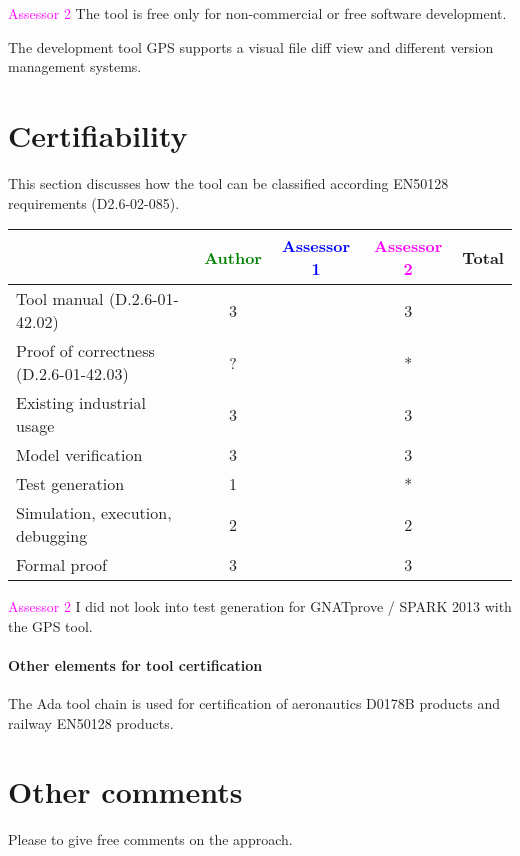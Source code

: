 \textcolor{magenta}{Assessor 2} The tool is free only for non-commercial or free
software development.

The development tool GPS supports a visual file diff view and different version
management systems.

\section{Certifiability}

This section discusses how the tool can be classified according EN50128 requirements (D2.6-02-085).


\begin{tabular}{|l | c | c | c | c|}
\hline
& \textcolor{green}{Author} & \textcolor{blue}{Assessor 1} & \textcolor{magenta}{Assessor 2} & Total \\
\hline 
Tool manual (D.2.6-01-42.02) & 3    & & 3    &  \\
\hline
Proof of correctness (D.2.6-01-42.03)   & ? & & * & \\
\hline
Existing industrial  usage  & 3    &  & 3    & \\
\hline
Model verification & 3    & & 3    & \\
\hline
Test generation & 1    & & * & \\
\hline
Simulation, execution, debugging & 2    & & 2    & \\
\hline
Formal proof & 3    & & 3    & \\
\hline
\end{tabular}

\textcolor{magenta}{Assessor 2} I did not look into test generation for
GNATprove / SPARK 2013 with the GPS tool.

\paragraph{Other elements for tool certification}


The Ada tool chain is used for certification of aeronautics D0178B
products and railway EN50128 products.

\section{Other comments}
Please to  give free comments on the approach.



